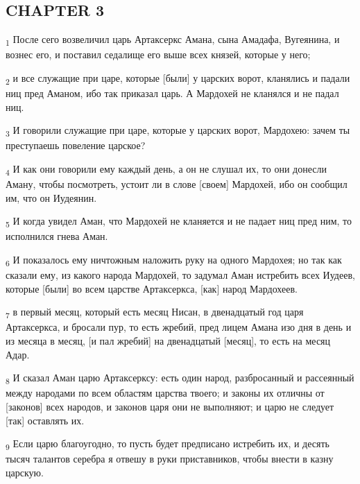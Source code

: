 \subsection{CHAPTER 3}
\begin{tcolorbox}
\textsubscript{1} После сего возвеличил царь Артаксеркс Амана, сына Амадафа, Вугеянина, и вознес его, и поставил седалище его выше всех князей, которые у него;
\end{tcolorbox}
\begin{tcolorbox}
\textsubscript{2} и все служащие при царе, которые [были] у царских ворот, кланялись и падали ниц пред Аманом, ибо так приказал царь. А Мардохей не кланялся и не падал ниц.
\end{tcolorbox}
\begin{tcolorbox}
\textsubscript{3} И говорили служащие при царе, которые у царских ворот, Мардохею: зачем ты преступаешь повеление царское?
\end{tcolorbox}
\begin{tcolorbox}
\textsubscript{4} И как они говорили ему каждый день, а он не слушал их, то они донесли Аману, чтобы посмотреть, устоит ли в слове [своем] Мардохей, ибо он сообщил им, что он Иудеянин.
\end{tcolorbox}
\begin{tcolorbox}
\textsubscript{5} И когда увидел Аман, что Мардохей не кланяется и не падает ниц пред ним, то исполнился гнева Аман.
\end{tcolorbox}
\begin{tcolorbox}
\textsubscript{6} И показалось ему ничтожным наложить руку на одного Мардохея; но так как сказали ему, из какого народа Мардохей, то задумал Аман истребить всех Иудеев, которые [были] во всем царстве Артаксеркса, [как] народ Мардохеев.
\end{tcolorbox}
\begin{tcolorbox}
\textsubscript{7} в первый месяц, который есть месяц Нисан, в двенадцатый год царя Артаксеркса, и бросали пур, то есть жребий, пред лицем Амана изо дня в день и из месяца в месяц, [и пал жребий] на двенадцатый [месяц], то есть на месяц Адар.
\end{tcolorbox}
\begin{tcolorbox}
\textsubscript{8} И сказал Аман царю Артаксерксу: есть один народ, разбросанный и рассеянный между народами по всем областям царства твоего; и законы их отличны от [законов] всех народов, и законов царя они не выполняют; и царю не следует [так] оставлять их.
\end{tcolorbox}
\begin{tcolorbox}
\textsubscript{9} Если царю благоугодно, то пусть будет предписано истребить их, и десять тысяч талантов серебра я отвешу в руки приставников, чтобы внести в казну царскую.
\end{tcolorbox}
